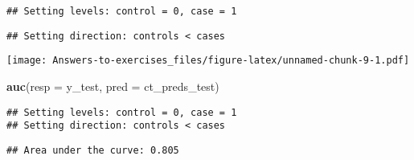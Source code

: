 \documentclass[
]{article}
\newenvironment{Shaded}{\begin{snugshade}}{\end{snugshade}}
\newcommand{\AttributeTok}[1]{\textcolor[rgb]{0.13,0.29,0.53}{#1}}
\newcommand{\FunctionTok}[1]{\textcolor[rgb]{0.13,0.29,0.53}{\textbf{#1}}}
\newcommand{\NormalTok}[1]{#1}
\begin{document}
\begin{verbatim}
## Setting levels: control = 0, case = 1
\end{verbatim}

\begin{verbatim}
## Setting direction: controls < cases
\end{verbatim}

\texttt{[image: Answers-to-exercises\_files/figure-latex/unnamed-chunk-9-1.pdf]}

\begin{Shaded}
\begin{Highlighting}[]
\FunctionTok{auc}\NormalTok{(}\AttributeTok{resp =}\NormalTok{ y\_test, }\AttributeTok{pred =}\NormalTok{ ct\_preds\_test)}
\end{Highlighting}
\end{Shaded}

\begin{verbatim}
## Setting levels: control = 0, case = 1
## Setting direction: controls < cases
\end{verbatim}

\begin{verbatim}
## Area under the curve: 0.805
\end{verbatim}
\end{document}
